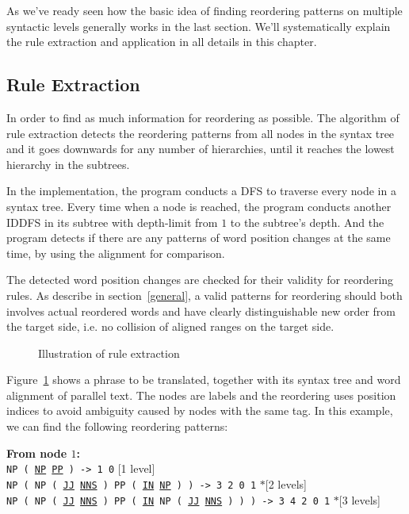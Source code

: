 As we've ready seen how the basic idea of finding reordering patterns on multiple syntactic levels generally works in the last section. We'll systematically explain the rule extraction and application in all details in this chapter.

\subsection{Rule Extraction}

In order to find as much information for reordering as possible. The algorithm of rule extraction detects the reordering patterns from all nodes in the syntax tree and it goes downwards for any number of hierarchies, until it reaches the lowest hierarchy in the subtrees.

In the implementation, the program conducts a \ac{DFS} to traverse every node in a syntax tree. Every time when a node is reached, the program conducts another \ac{IDDFS} in its subtree with depth-limit from $1$ to the subtree's depth. And the program detects if there are any patterns of word position changes at the same time, by using the alignment for comparison.

The detected word position changes are checked for their validity for reordering rules. As describe in section~\ref{general}, a valid patterns for reordering should both involves actual reordered words and have clearly distinguishable new order from the target side, i.e. no collision of aligned ranges on the target side.

\begin{figure}[H]
\centering

\caption{Illustration of rule extraction}
\label{extract}
\end{figure}

Figure~\ref{extract} shows a phrase to be translated, together with its syntax tree and word alignment of parallel text. The nodes are labels and the reordering uses position indices to avoid ambiguity caused by nodes with the same tag. In this example, we can find the following reordering patterns:

\textbf{From node $1$:}\\
\texttt{NP ( \ul{NP} \ul{PP} ) -> 1 0} \hfill [1 level]\\
\texttt{NP ( NP ( \ul{JJ} \ul{NNS} ) PP ( \ul{IN} \ul{NP} ) ) -> 3 2 0 1} \hfill $*$[2 levels]\\
\texttt{NP ( NP ( \ul{JJ} \ul{NNS} ) PP ( \ul{IN} NP ( \ul{JJ} \ul{NNS} ) ) ) -> 3 4 2 0 1} \hfill $*$[3 levels]

